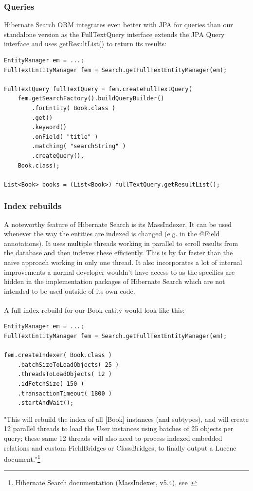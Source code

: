 \pagebreak

\subsubsection{Queries} \label{hsearch_orm_querying}
Hibernate Search ORM integrates even better with JPA for queries than our standalone version as the FullTextQuery interface extends the JPA Query interface and uses getResultList() to return its results:
\\
\lstset{language=java}
\begin{lstlisting}[frame=htrbl, caption={Querying with Hibernate Search ORM}, label={lst:querying_hsearch_orm.java_1}]
EntityManager em = ...;
FullTextEntityManager fem = Search.getFullTextEntityManager(em);

FullTextQuery fullTextQuery = fem.createFullTextQuery(
	fem.getSearchFactory().buildQueryBuilder()
		.forEntity( Book.class )
		.get()
		.keyword()
		.onField( "title" )
		.matching( "searchString" )
		.createQuery(), 
	Book.class);
	
List<Book> books = (List<Book>) fullTextQuery.getResultList();
\end{lstlisting}

\pagebreak

\subsubsection{Index rebuilds}
A noteworthy feature of Hibernate Search is its MassIndexer. It can be used whenever the way the entities are indexed is changed (e.g. in the @Field annotations). It uses multiple threads working in parallel to scroll results from the database and then indexes these efficiently. This is by far faster than the naive approach working in only one thread. It also incorporates a lot of internal improvements a normal developer wouldn't have access to as the specifics are hidden in the implementation packages of Hibernate Search which are not intended to be used outside of its own code.
\\\\
A full index rebuild for our Book entity would look like this:
\\
\lstset{language=java}
\begin{lstlisting}[frame=htrbl, caption={MassIndexer usage with Hibernate Search ORM}, label={lst:massindexing_hsearch_orm.java}]
EntityManager em = ...;
FullTextEntityManager fem = Search.getFullTextEntityManager(em);

fem.createIndexer( Book.class )
	.batchSizeToLoadObjects( 25 )
	.threadsToLoadObjects( 12 )
	.idFetchSize( 150 )
	.transactionTimeout( 1800 )
	.startAndWait();
\end{lstlisting}
\noindent
"This will rebuild the index of all [Book] instances (and subtypes), and will create 12 parallel threads to load the User instances using batches of 25 objects per query; these same 12 threads will also need to process indexed embedded relations and custom FieldBridges or ClassBridges, to finally output a Lucene document."\footnote{Hibernate Search documentation (MassIndexer, v5.4), see~\cite{hibernate_search_doc_massindexer}}


